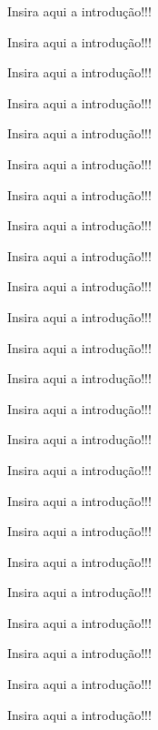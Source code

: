 \documentclass[oneside,openright,12pt]{ufsm_2015} %
\begin{document}
{\par Insira aqui a introdução!!!

\par Insira aqui a introdução!!!

\par Insira aqui a introdução!!!

\par Insira aqui a introdução!!!

\par Insira aqui a introdução!!!

\par Insira aqui a introdução!!!

\par Insira aqui a introdução!!!

\par Insira aqui a introdução!!!

\par Insira aqui a introdução!!!

\par Insira aqui a introdução!!!

\par Insira aqui a introdução!!!

\par Insira aqui a introdução!!!

\par Insira aqui a introdução!!!

\par Insira aqui a introdução!!!

\par Insira aqui a introdução!!!

\par Insira aqui a introdução!!!

\par Insira aqui a introdução!!!

\par Insira aqui a introdução!!!

\par Insira aqui a introdução!!!

\par Insira aqui a introdução!!!

\par Insira aqui a introdução!!!

\par Insira aqui a introdução!!!
\par Insira aqui a introdução!!!

\par Insira aqui a introdução!!!

}
\end{document}
